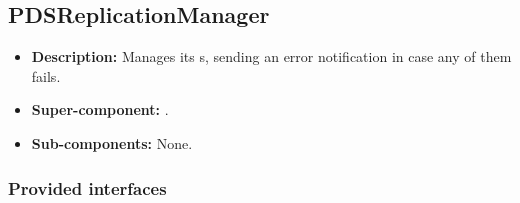 \subsection{PDSReplicationManager}
\begin{itemize}
    \item \textbf{Description:} Manages its s, sending an error notification in case any of them fails.
    \item \textbf{Super-component:} .
    \item \textbf{Sub-components:} None.
\end{itemize}

\subsubsection*{Provided interfaces}
